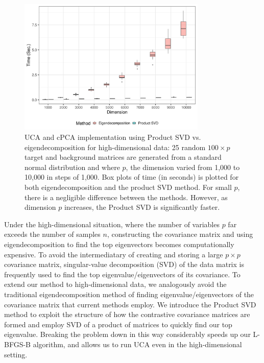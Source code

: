 \documentclass[12pt]{article}
\begin{document}
\begin{figure}[!ht]
  \centering
  \includegraphics[width = 0.8\textwidth]{figure/final_perf.png}
  \caption{UCA and cPCA implementation using Product SVD vs. eigendecomposition for high-dimensional data: 25 random $100 \times p $ target and background matrices are generated from a standard normal distribution and where $p$, the dimension varied from 1,000 to 10,000 in steps of 1,000. Box plots of time (in seconds) is plotted for both eigendecomposition and the product SVD method. For small $p$, there is a negligible difference between the methods. However, as dimension $p$ increases, the Product SVD is significantly faster.}
  \label{fig:computational_perf}
\end{figure}

Under the high-dimensional situation, where the number of variables $p$ far exceeds the number of samples $n$, constructing the covariance matrix and using eigendecomposition to find the top eigenvectors becomes computationally expensive. To avoid the intermediatary of creating and storing a large $p \times p$ covariance matrix, singular-value decomposition (SVD) of the data matrix is frequently used to find the top eigenvalue/eigenvectors of its covariance.
To extend our method to high-dimensional data, we analogously avoid the traditional eigendecomposition method of finding eigenvalue/eigenvectors of the covariance matrix that current methods employ.
We introduce the Product SVD method to exploit the structure of how the contrastive covariance matrices are formed and employ SVD of a product of matrices to quickly find our top eigenvalue.  Breaking the problem down in this way considerably speeds up our L-BFGS-B algorithm, and allows us to run UCA even in the high-dimensional setting.
\end{document}
